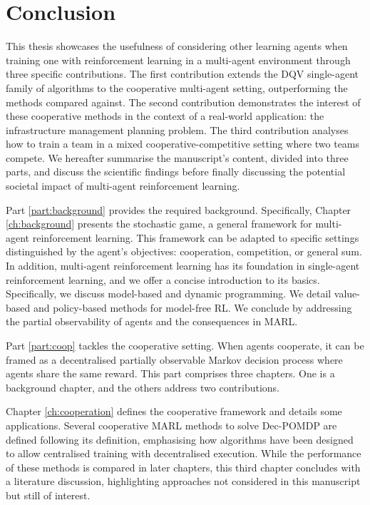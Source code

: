 \chapter{Conclusion}\label{ch:conclusion}

This thesis showcases the usefulness of considering other learning agents when training one with reinforcement learning in a multi-agent environment through three specific contributions.
The first contribution extends the DQV single-agent family of algorithms to the cooperative multi-agent setting, outperforming the methods compared against.
The second contribution demonstrates the interest of these cooperative methods in the context of a real-world application: the infrastructure management planning problem.
The third contribution analyses how to train a team in a mixed cooperative-competitive setting where two teams compete.
We hereafter summarise the manuscript's content, divided into three parts, and discuss the scientific findings before finally discussing the potential societal impact of multi-agent reinforcement learning.

Part \ref{part:background} provides the required background.
Specifically, Chapter \ref{ch:background} presents the stochastic game, a general framework for multi-agent reinforcement learning. 
This framework can be adapted to specific settings distinguished by the agent's objectives: cooperation, competition, or general sum.
In addition, multi-agent reinforcement learning has its foundation in single-agent reinforcement learning, and we offer a concise introduction to its basics.
Specifically, we discuss model-based and dynamic programming.
We detail value-based and policy-based methods for model-free RL.
We conclude by addressing the partial observability of agents and the consequences in MARL.

Part \ref{part:coop} tackles the cooperative setting.
When agents cooperate, it can be framed as a decentralised partially observable Markov decision process where agents share the same reward.
This part comprises three chapters.
One is a background chapter, and the others address two contributions.

Chapter \ref{ch:cooperation} defines the cooperative framework and details some applications.
Several cooperative MARL methods to solve Dec-POMDP are defined following its definition, emphasising how algorithms have been designed to allow centralised training with decentralised execution.
While the performance of these methods is compared in later chapters, this third chapter concludes with a literature discussion, highlighting approaches not considered in this manuscript but still of interest.

